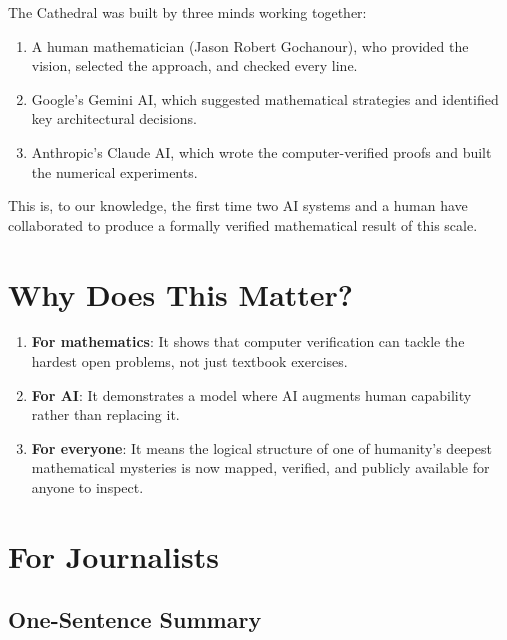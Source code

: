 \documentclass[11pt,a4paper]{article}
\begin{document}
The Cathedral was built by three minds working together:

\begin{enumerate}
  \item A human mathematician (Jason Robert Gochanour), who provided
    the vision, selected the approach, and checked every line.
  \item Google's Gemini AI, which suggested mathematical strategies
    and identified key architectural decisions.
  \item Anthropic's Claude AI, which wrote the computer-verified
    proofs and built the numerical experiments.
\end{enumerate}

This is, to our knowledge, the first time two AI systems and a
human have collaborated to produce a formally verified mathematical
result of this scale.

\section{Why Does This Matter?}

\begin{enumerate}
  \item \textbf{For mathematics}: It shows that computer verification
    can tackle the hardest open problems, not just textbook exercises.
  \item \textbf{For AI}: It demonstrates a model where AI augments
    human capability rather than replacing it.
  \item \textbf{For everyone}: It means the logical structure of one
    of humanity's deepest mathematical mysteries is now mapped,
    verified, and publicly available for anyone to inspect.
\end{enumerate}

\section{For Journalists}

\subsection{One-Sentence Summary}
\end{document}
